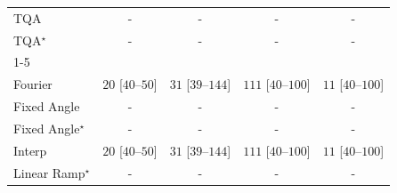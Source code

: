 \begin{tabular}{l|cccc|}
TQA & {\cellcolor[HTML]{000000}} \color[HTML]{F1F1F1} {\cellcolor{white}} \color{black} - & {\cellcolor[HTML]{000000}} \color[HTML]{F1F1F1} {\cellcolor{white}} \color{black} - & {\cellcolor[HTML]{000000}} \color[HTML]{F1F1F1} {\cellcolor{white}} \color{black} - & {\cellcolor[HTML]{000000}} \color[HTML]{F1F1F1} {\cellcolor{white}} \color{black} - \\
TQA$^\star$ & {\cellcolor[HTML]{000000}} \color[HTML]{F1F1F1} {\cellcolor{white}} \color{black} - & {\cellcolor[HTML]{000000}} \color[HTML]{F1F1F1} {\cellcolor{white}} \color{black} - & {\cellcolor[HTML]{000000}} \color[HTML]{F1F1F1} {\cellcolor{white}} \color{black} - & {\cellcolor[HTML]{000000}} \color[HTML]{F1F1F1} {\cellcolor{white}} \color{black} - \\
\cline{1-5}
\multicolumn{5}{c}{\rule{0pt}{8pt}PP} \\
\midrule
Fourier & {\cellcolor[HTML]{F5FBF3}} \color[HTML]{000000} $20$ [$40$--$50$] & {\cellcolor[HTML]{F2FAF0}} \color[HTML]{000000} $31$ [$39$--$144$] & {\cellcolor[HTML]{DFF3DA}} \color[HTML]{000000} $111$ [$40$--$100$] & {\cellcolor[HTML]{F7FCF5}} \color[HTML]{000000} $11$ [$40$--$100$] \\
Fixed Angle & {\cellcolor[HTML]{000000}} \color[HTML]{F1F1F1} {\cellcolor{white}} \color{black} - & {\cellcolor[HTML]{000000}} \color[HTML]{F1F1F1} {\cellcolor{white}} \color{black} - & {\cellcolor[HTML]{000000}} \color[HTML]{F1F1F1} {\cellcolor{white}} \color{black} - & {\cellcolor[HTML]{000000}} \color[HTML]{F1F1F1} {\cellcolor{white}} \color{black} - \\
Fixed Angle$^\star$ & {\cellcolor[HTML]{000000}} \color[HTML]{F1F1F1} {\cellcolor{white}} \color{black} - & {\cellcolor[HTML]{000000}} \color[HTML]{F1F1F1} {\cellcolor{white}} \color{black} - & {\cellcolor[HTML]{000000}} \color[HTML]{F1F1F1} {\cellcolor{white}} \color{black} - & {\cellcolor[HTML]{000000}} \color[HTML]{F1F1F1} {\cellcolor{white}} \color{black} - \\
Interp & {\cellcolor[HTML]{F5FBF3}} \color[HTML]{000000} $20$ [$40$--$50$] & {\cellcolor[HTML]{F2FAF0}} \color[HTML]{000000} $31$ [$39$--$144$] & {\cellcolor[HTML]{DFF3DA}} \color[HTML]{000000} $111$ [$40$--$100$] & {\cellcolor[HTML]{F7FCF5}} \color[HTML]{000000} $11$ [$40$--$100$] \\
Linear Ramp$^\star$ & {\cellcolor[HTML]{000000}} \color[HTML]{F1F1F1} {\cellcolor{white}} \color{black} - & {\cellcolor[HTML]{000000}} \color[HTML]{F1F1F1} {\cellcolor{white}} \color{black} - & {\cellcolor[HTML]{000000}} \color[HTML]{F1F1F1} {\cellcolor{white}} \color{black} - & {\cellcolor[HTML]{000000}} \color[HTML]{F1F1F1} {\cellcolor{white}} \color{black} - \\

\end{tabular}
